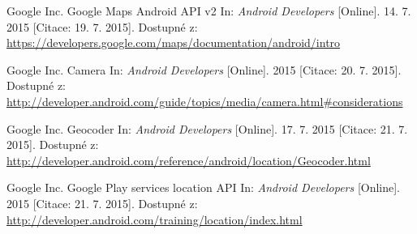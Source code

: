 \documentclass[12pt]{article}
\begin{document}
\begin{thebibliography}{1}
 Google Inc. Google Maps Android API v2 In: \emph{Android Developers}
[Online]. 14. 7. 2015 [Citace: 19. 7. 2015]. Dostupné z: \url{https://developers.google.com/maps/documentation/android/intro}

 Google Inc. Camera In: \emph{Android Developers}
[Online]. 2015 [Citace: 20. 7. 2015]. Dostupné z: \url{http://developer.android.com/guide/topics/media/camera.html#considerations}

 Google Inc. Geocoder In: \emph{Android Developers}
[Online]. 17. 7. 2015 [Citace: 21. 7. 2015]. Dostupné z: \url{http://developer.android.com/reference/android/location/Geocoder.html}

 Google Inc. Google Play services location API In: \emph{Android Developers}
[Online]. 2015 [Citace: 21. 7. 2015]. Dostupné z: \url{http://developer.android.com/training/location/index.html}

\end{thebibliography}
\end{document}
